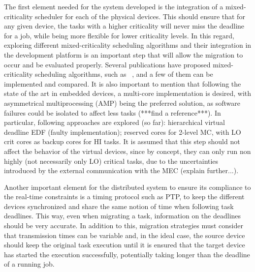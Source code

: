 The first element needed for the system developed is the integration of a mixed-criticality scheduler for each of the physical devices. This should ensure that for any given device, the tasks with a higher criticality will never miss the deadline for a job, while being more flexible for lower criticality levels. In this regard, exploring different mixed-criticality scheduling algorithms and their integration in the development platform is an important step that will allow the migration to occur and be evaluated properly. Several publications have proposed mixed-criticality scheduling algorithms, such as ~\parencite{baruah1, fleming1, zhao1, baruah2, lili1}, and a few of them can be implemented and compared. It is also important to mention that following the state of the art in embedded devices, a multi-core implementation is desired, with asymmetrical multiprocessing (AMP) being the preferred solution, as software failures could be isolated to affect less tasks (***find a reference***). In particular, following approaches are explored (so far): hierarchical virtual deadline EDF (faulty implementation); reserved cores for 2-level MC, with LO crit cores as backup cores for HI tasks. It is assumed that this step should not affect the behavior of the virtual devices, since by concept, they can only run non highly (not necessarily only LO) critical tasks, due to the uncertainties introduced by the external communication with the MEC (explain further...).

Another important element for the distributed system to ensure its compliance to the real-time constraints is a timing protocol such as PTP, to keep the different devices synchronized and share the same notion of time when following task deadlines. This way, even when migrating a task, information on the deadlines should be very accurate. In addition to this, migration strategies must consider that transmission times can be variable and, in the ideal case, the source device should keep the original task execution until it is ensured that the target device has started the execution successfully, potentially taking longer than the deadline of a running job.

